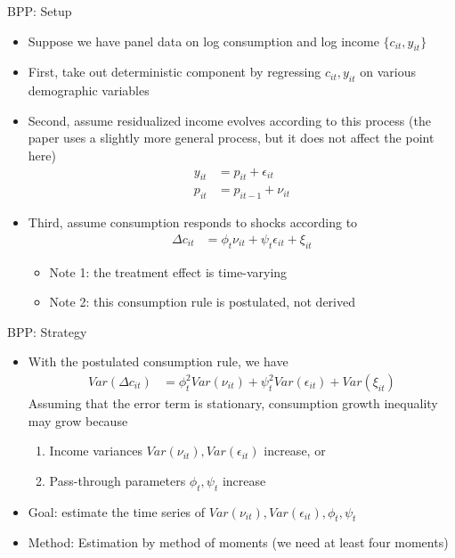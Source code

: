 \documentclass[9pt]{beamer}
\newcommand{\bit}{\begin{itemize}}
\newcommand{\eit}{\end{itemize}}
\newcommand{\ben}{\begin{enumerate}}
\newcommand{\een}{\end{enumerate}}
\begin{document}
\begin{frame}{BPP: Setup}

\bit
\setlength\itemsep{1em}
\item Suppose we have panel data on log consumption and log income $\{c_{it}, y_{it}\}$

\item First, take out deterministic component by regressing $c_{it}, y_{it}$ on various demographic variables

\item Second, assume residualized income evolves according to this process (the paper uses a slightly more general process, but it does not affect the point here)
\begin{align*}
y_{it} &= p_{it} + \epsilon_{it} \\
p_{it} &= p_{it-1} + \nu_{it} 
\end{align*}

\item Third, assume consumption responds to shocks according to
\begin{align*}
\Delta c_{it} &= \phi_{t} \nu_{it} + \psi_{t} \epsilon_{it} + \xi_{it}
\end{align*}
\bit
\item Note 1: the treatment effect is time-varying 

\item Note 2: this consumption rule is postulated, not derived
\eit
\eit

  \end{frame}

\begin{frame}{BPP: Strategy}

\bit
\setlength\itemsep{1.5em}
\item With the postulated consumption rule, we have
\begin{align*}
Var(\Delta c_{it}) &= \phi^2_{t} Var(\nu_{it}) + \psi^2_{t} Var(\epsilon_{it}) + Var(\xi_{it})
\end{align*}
Assuming that the error term is stationary, consumption growth inequality may grow because 
\ben
	\item Income variances $Var(\nu_{it}), Var(\epsilon_{it})$ increase, or
	\item Pass-through parameters $\phi_t, \psi_t$ increase
\een

\item Goal: estimate the time series of $Var(\nu_{it}), Var(\epsilon_{it}), \phi_t, \psi_t$

\item Method: Estimation by method of moments (we need at least four moments)

\eit

\end{frame}
\end{document}
